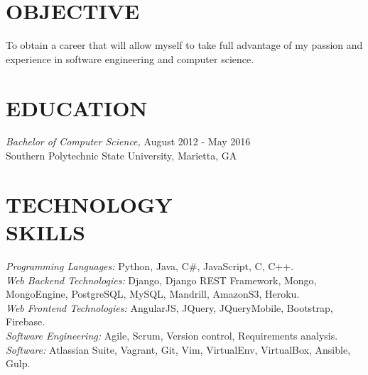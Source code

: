 \documentclass[margin, 10pt]{res} %
\begin{document}
  \begin{resume}


   \section{OBJECTIVE}

   To obtain a career that will allow myself to take full advantage of my passion and experience in software engineering and computer science.


   \section{EDUCATION}

   {\sl Bachelor of Computer Science,}  \hfill August 2012 - May 2016 \\
   Southern Polytechnic State University, Marietta, GA\\


    \section{TECHNOLOGY \\ SKILLS}

    {\sl Programming Languages:} Python, Java, C\#, JavaScript, C, C++. \\
    {\sl Web Backend Technologies:} Django, Django REST Framework, Mongo, MongoEngine, PostgreSQL, MySQL, Mandrill, AmazonS3, Heroku. \\
    {\sl Web Frontend Technologies:} AngularJS, JQuery, JQueryMobile, Bootstrap, Firebase. \\
    {\sl Software Engineering:} Agile, Scrum, Version control, Requirements analysis. \\
    {\sl Software:} Atlassian Suite, Vagrant, Git, Vim, VirtualEnv, VirtualBox, Ansible, Gulp. \\


\end{resume}
\end{document}

